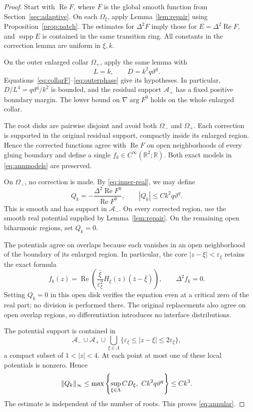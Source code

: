 \documentclass[11pt,a4paper,leqno]{amsart}
\numberwithin{equation}{section}
\theoremstyle{landisplain}
\theoremstyle{landisdefinition}
\theoremstyle{landisremark}
\newcommand{\R}{\mathbb R}
\newcommand{\eps}{\varepsilon}
\newcommand{\Rea}{\operatorname{Re}}
\newcommand{\supp}{\operatorname{supp}}
\DeclarePairedDelimiter{\norm}{\lVert}{\rVert}
\begin{document}
\begin{proof}
Start with $\Rea F$, where $F$ is the global smooth function from
Section~\ref{sec:adaptive}. On each $\Omega_\xi$, apply
Lemma~\ref{lem:repair} using Proposition~\ref{prop:patch}.
The estimates for $\Delta^2F$ imply those for
$E=\Delta^2\Rea F$, and $\supp E$ is contained in the same
transition ring. All constants in the correction lemma are uniform
in $\xi,k$.

On the outer enlarged collar $\Omega_+$, apply the same lemma with
\begin{equation}\label{eq:outer-LD}
 L=k,\qquad D=k^2q\vartheta^q.
\end{equation}
Equations~\eqref{eq:collarF}--\eqref{eq:outerphase} give its
hypotheses. In particular, $D/L^4=q\vartheta^q/k^2$ is bounded,
and the residual support $\mathcal A_+$ has a fixed positive
boundary margin. The lower bound on $\nabla\arg F^0$ holds on the
whole enlarged collar.

The root disks are pairwise disjoint and avoid both
$\Omega_-$ and $\Omega_+$. Each correction is supported in
the original residual support, compactly inside its enlarged
region. Hence the corrected functions agree with $\Rea F$
on open neighborhoods of every gluing boundary and define a
single $f_k\in C^\infty(\R^2;\R)$. Both exact models in
\eqref{eq:annmodels} are preserved.

On $\Omega_-$, no correction is made. By \eqref{eq:inner-real},
we may define
\[
 Q_k=-\frac{\Delta^2\Rea F^0}{\Rea F^0},\qquad
 |Q_k|\le Ck^2q\vartheta^q.
\]
This is smooth and has support in $\mathcal A_-$.
On every corrected region, use the smooth real potential supplied
by Lemma~\ref{lem:repair}. On the remaining open biharmonic
regions, set $Q_k=0$.

The potentials agree on overlaps because each vanishes in an
open neighborhood of the boundary of its enlarged region. In
particular, the core $|z-\xi|<\eps_\xi$ retains the exact
formula
\[
 f_k(z)=\Rea\left(
     \frac{\bar\xi}{\eps_\xi^2}H_\xi(z)(\bar z-\bar\xi)\right),
 \qquad \Delta^2f_k=0.
\]
Setting $Q_k=0$ in this open disk verifies the equation even
at a critical zero of the real part; no division is performed
there. The original replacements also agree on open overlap
regions, so differentiation introduces no interface distributions.

The potential support is contained in
\begin{equation}\label{eq:annular-support}
 \mathcal A_-\cup\mathcal A_+
 \cup\bigcup_{\xi\in\Lambda}
      \{\eps_\xi\le|z-\xi|\le2\eps_\xi\},
\end{equation}
a compact subset of $1<|z|<4$. At each point at most one of these
local potentials is nonzero. Hence
\[
 \norm{Q_k}_\infty
 \le\max\left\{
       \sup_{\xi\in\Lambda}CD_\xi,\ Ck^2q\vartheta^q\right\}
 \le Ck^3.
\]
The estimate is independent of the number of roots. This proves
\eqref{eq:annular}.
\end{proof}
\end{document}
